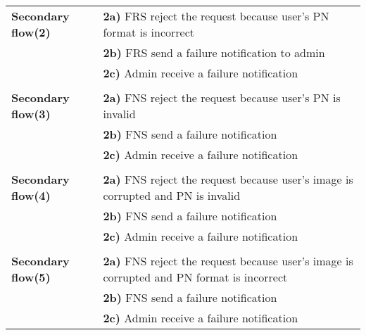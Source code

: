 \documentclass[a4paper,11pt]{article}
\begin{document}
\begin{tabular}{|p{3.5cm}|p{11.5cm}|}
    \\ \hline \rowcolor{Gray} & \\ \hline 
     
    \textbf{Secondary flow(2)} & 
    \textbf{2a)} FRS reject the request because user's PN format is incorrect \\&
    \textbf{2b)} FRS send a failure notification to admin\\&
    \textbf{2c)} Admin receive a failure notification
    
   \\ \hline \rowcolor{Gray} & \\ \hline
    
    \textbf{Secondary flow(3)} & 
    \textbf{2a)} FNS reject the request because user's PN is invalid \\&
    \textbf{2b)} FNS send a failure notification \\&
    \textbf{2c)} Admin receive a failure notification
    
    \\ \hline \rowcolor{Gray} & \\ \hline
    
    \textbf{Secondary flow(4)} & 
    \textbf{2a)} FNS reject the request because user's image is corrupted and PN is invalid\\&
    \textbf{2b)} FNS send a failure notification \\&
    \textbf{2c)} Admin receive a failure notification
    
    \\ \hline \rowcolor{Gray} & \\ \hline
    
    \textbf{Secondary flow(5)} & 
    \textbf{2a)} FNS reject the request because user's image is corrupted and PN format is incorrect\\&
    \textbf{2b)} FNS send a failure notification \\&
    \textbf{2c)} Admin receive a failure notification
    \\\hline 
\end{tabular}


\newpage
\noindent
\end{document}
